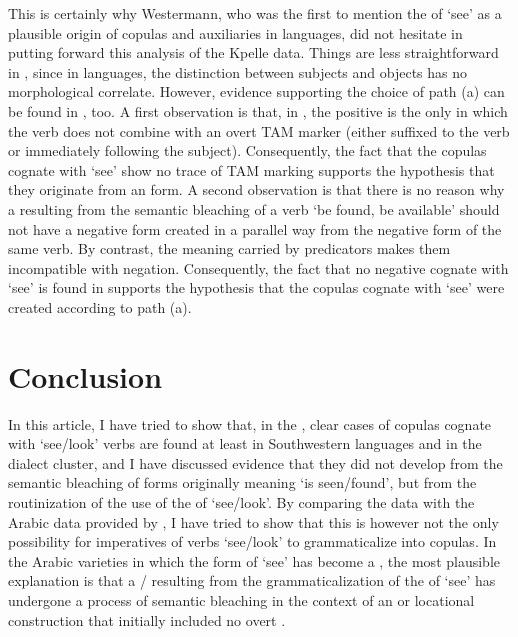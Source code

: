 \documentclass[output=paper]{langsci/langscibook}
\begin{document}
This is certainly why Westermann, who was the first to mention the  of ‘see’ as a plausible origin of copulas and  auxiliaries in  languages, did not hesitate in putting forward this analysis of the Kpelle data.
  Things are less straightforward in , since in  languages, the distinction between subjects and objects has no morphological correlate. However, evidence supporting the choice of path (a) can be found in , too.
  A first observation is that, in , the  positive is the only  in which the verb does not combine with an overt TAM marker (either suffixed to the verb or immediately following the subject). Consequently, the fact that the  copulas cognate with ‘see’ show no trace of TAM marking supports the hypothesis that they originate from an  form.
  A second observation is that there is no reason why a  resulting from the semantic bleaching of a verb ‘be found, be available’ should not have a negative form created in a parallel way from the negative form of the same verb. By contrast, the meaning carried by  predicators makes them incompatible with negation. Consequently, the fact that no negative  cognate with ‘see’ is found in  supports the hypothesis that the  copulas cognate with ‘see’ were created according to path (a).
  
\section{Conclusion}\label{sec:creissels:8} 

In this article, I have tried to show that, in the  , clear cases of copulas cognate with ‘see\slash look’ verbs are found at least in Southwestern  languages and in the  dialect cluster, and I have discussed evidence that they did not develop from the semantic bleaching of forms originally meaning ‘is seen\slash found’, but from the routinization of the  use of the  of ‘see\slash look’. By comparing the  data with the Arabic data provided by \citet{Taine-Cheikh2013}, I have tried to show that this is however not the only possibility for imperatives of verbs ‘see\slash look’ to grammaticalize into copulas. In the Arabic varieties in which the  form of ‘see’ has become a , the most plausible explanation is that a / resulting from the grammaticalization of the  of ‘see’ has undergone a process of semantic bleaching in the context of an  or locational  construction that initially included no overt . 
\largerpage[3]
\end{document}
